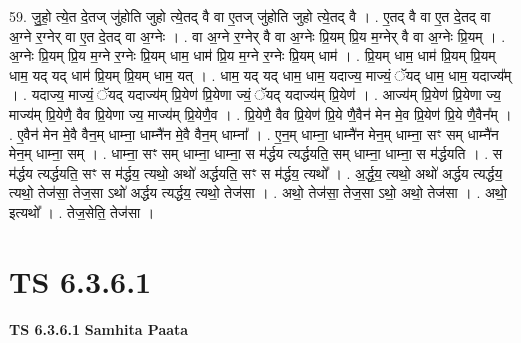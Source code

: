 \documentclass[17pt]{extarticle}
\begin{document}
59. जु॒हो॒ त्ये॒त दे॒तज् जु॑होति जुहो त्ये॒तद् वै वा ए॒तज् जु॑होति जुहो त्ये॒तद् वै । . ए॒तद् वै वा ए॒त दे॒तद् वा अ॒ग्ने र॒ग्नेर् वा ए॒त दे॒तद् वा अ॒ग्नेः । . वा अ॒ग्ने र॒ग्नेर् वै वा अ॒ग्नेः प्रि॒यम् प्रि॒य म॒ग्नेर् वै वा अ॒ग्नेः प्रि॒यम् । . अ॒ग्नेः प्रि॒यम् प्रि॒य म॒ग्ने र॒ग्नेः प्रि॒यम् धाम॒ धाम॑ प्रि॒य म॒ग्ने र॒ग्नेः प्रि॒यम् धाम॑ । . प्रि॒यम् धाम॒ धाम॑ प्रि॒यम् प्रि॒यम् धाम॒ यद् यद् धाम॑ प्रि॒यम् प्रि॒यम् धाम॒ यत् । . धाम॒ यद् यद् धाम॒ धाम॒ यदाज्य॒ माज्यं॒ ॅयद् धाम॒ धाम॒ यदाज्य᳚म् । . यदाज्य॒ माज्यं॒ ॅयद् यदाज्य॑म् प्रि॒येण॑ प्रि॒येणा ज्यं॒ ॅयद् यदाज्य॑म् प्रि॒येण॑ । . आज्य॑म् प्रि॒येण॑ प्रि॒येणा ज्य॒ माज्य॑म् प्रि॒येणै॒ वैव प्रि॒येणा ज्य॒ माज्य॑म् प्रि॒येणै॒व । . प्रि॒येणै॒ वैव प्रि॒येण॑ प्रि॒ये णै॒वैन॑ मेन मे॒व प्रि॒येण॑ प्रि॒ये णै॒वैन᳚म् । . ए॒वैन॑ मेन मे॒वै वैन॒म् धाम्ना॒ धाम्नै॑न मे॒वै वैन॒म् धाम्ना᳚ । . ए॒न॒म् धाम्ना॒ धाम्नै॑न मेन॒म् धाम्ना॒ सꣳ सम् धाम्नै॑न मेन॒म् धाम्ना॒ सम् । . धाम्ना॒ सꣳ सम् धाम्ना॒ धाम्ना॒ स म॑र्द्धय त्यर्द्धयति॒ सम् धाम्ना॒ धाम्ना॒ स म॑र्द्धयति । . स म॑र्द्धय त्यर्द्धयति॒ सꣳ स म॑र्द्धय॒ त्यथो॒ अथो॑ अर्द्धयति॒ सꣳ स म॑र्द्धय॒ त्यथो᳚ । . अ॒र्द्ध॒य॒ त्यथो॒ अथो॑ अर्द्धय त्यर्द्धय॒ त्यथो॒ तेज॑सा॒ तेज॒सा ऽथो॑ अर्द्धय त्यर्द्धय॒ त्यथो॒ तेज॑सा । . अथो॒ तेज॑सा॒ तेज॒सा ऽथो॒ अथो॒ तेज॑सा । . अथो॒ इत्यथो᳚ । . तेज॒सेति॒ तेज॑सा । \newline
\pagebreak
{}

\section{ TS 6.3.6.1 }

\textbf{TS 6.3.6.1 } \newline
\textbf{Samhita Paata} \newline
\end{document}
